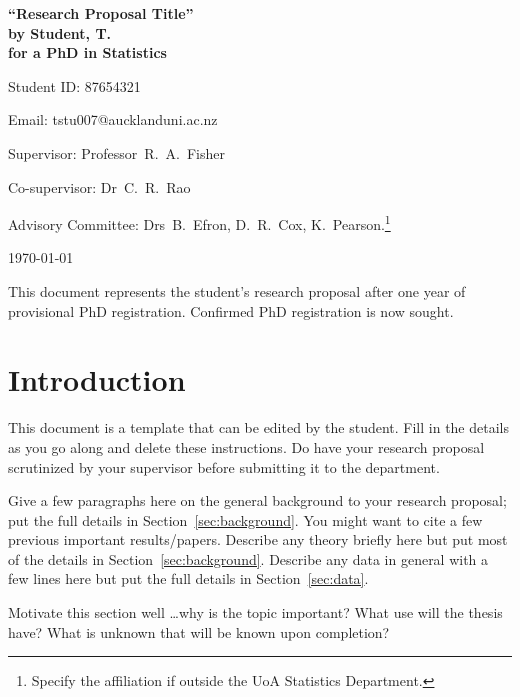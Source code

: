 \documentclass[12pt,a4paper]{article}
\begin{document}
\begin{Large}
\begin{center}
\textbf{``Research Proposal Title''} \\
\textbf{by Student, T.} \\
\textbf{for a PhD in Statistics}
\end{center}
\end{Large}


\hfill{Student ID: 87654321}

\hfill{Email: tstu007@aucklanduni.ac.nz}

Supervisor: Professor~R.~A.~Fisher

Co-supervisor: Dr~C.~R.~Rao

Advisory Committee: Drs~B.~Efron, D.~R.~Cox, K.~Pearson.\footnote{
Specify the affiliation if outside the UoA Statistics
Department.}



\begin{center}
\today
\end{center}


This document represents the student's research proposal after
one year of provisional PhD registration.
Confirmed PhD registration is now sought.




\section{Introduction}
\label{sec:intro}



This document is a template that can be edited by the student.
Fill in the details as you go along and delete these instructions.
Do have your research proposal scrutinized by your supervisor before
submitting it to the department.



Give a few paragraphs here on the general background
to your research proposal; put the full details in
Section~\ref{sec:background}. You might want to cite a few
previous important results/papers. Describe any theory briefly
here but put most of the details in Section~\ref{sec:background}.
Describe any data in general with a few lines here but put the
full details in Section~\ref{sec:data}.


Motivate this section well \ldots why is the topic important?
What use will the thesis have?
What is unknown that will be known upon completion?
\end{document}
